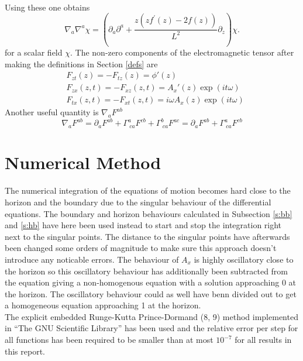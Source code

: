 \documentclass[12pt]{report}
\renewcommand{\i}{\ensuremath{i}}
\newcommand{\At}{\ensuremath{{\phi}}}
\begin{document}
\begin{appendices}
\begin{equation}
\begin{split}
\end{split}\label{CSsum}
\end{equation}
Using these one obtains
\begin{equation}
 \nabla_a\nabla^a\chi=\left(\partial_a\partial^a+\frac{z \left(z f^\prime\left(z\right) - 2 f\left(z\right)\right)}{L^{2}}\partial_z\right)\chi.
\end{equation}
for a scalar field $\chi$.
The non-zero components of the electromagnetic tensor after making the definitions in Section \ref{defs} are
\begin{equation}
\begin{split}
 &F_{zt}(z)=-F_{tz}(z)=\At'(z)\\
 &F_{zx}(z,t)=-F_{xz}(z,t)=A_x'(z)\exp(\i t \omega)\\
 &F_{tx}(z,t)=-F_{xt}(z,t)=\i\omega A_x(z)\exp(\i t \omega)
\end{split}
\end{equation}
Another useful quantity is
$\nabla_aF^{ab}$
\begin{equation}
 \nabla_aF^{ab}=\partial_aF^{ab}+\Gamma^a_{\ ca}F^{cb}+\Gamma^b_{\ ca}F^{ac}=\partial_aF^{ab}+\Gamma^a_{\ ca}F^{cb}
\end{equation}
\chapter{Numerical Method\label{a:num}}
The numerical integration of the equations of motion becomes hard close to the horizon and the boundary due to the singular behaviour of the differential equations. The boundary and horizon behaviours calculated in Subsection \ref{s:bb} and \ref{s:hb} have here been used instead to start and stop the integration right next to the singular points. The distance to the singular points have afterwards been changed some orders of magnitude to make sure this approach doesn't introduce any noticable errors. The behaviour of $A_x$ is highly oscillatory close to the horizon so this oscillatory behaviour has additionally been subtracted from the equation giving a non-homogenous equation with a solution approaching 0 at the horizon. The oscillatory behaviour could as well have benn divided out to get a homogeneous equation approaching 1 at the horizon.\\

The explicit embedded Runge-Kutta Prince-Dormand (8, 9) method implemented in ``The GNU Scientific Library'' \cite{gsl} has been used and the relative error per step for all functions has been required to be smaller than at most $10^{-7}$ for all results in this report.
\end{appendices}


\end{document}
